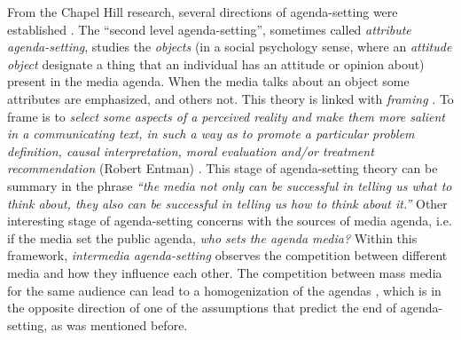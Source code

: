 \documentclass{bmcart}
\begin{document}
\par From the Chapel Hill research, several directions of agenda-setting were established \cite{mccombs2005look}.
The ``second level agenda-setting'', sometimes called \textit{attribute agenda-setting}, studies the \textit{objects} (in a social psychology sense, where an \textit{attitude object} designate a thing that an individual has an attitude or opinion about) present in the media agenda. When the media talks about an object some attributes are emphasized, and others not. 
This theory is linked with \textit{framing} \cite{guggenheim2015dynamics, tsur2015frame}. 
To frame is to \textit{select some aspects of a perceived reality and make them more salient in a communicating text, in such a way as to promote a particular problem definition, causal interpretation, moral evaluation and/or treatment recommendation} (Robert Entman) \cite{mccombs2005look}.
This stage of agenda-setting theory can be summary in the phrase \textit{``the media not only can be successful in telling us what to think about, they also can be successful in telling us how to think about it.''} 
Other interesting stage of agenda-setting concerns with the sources of media agenda, i.e. if the media set the public agenda, \textit{who sets the agenda media?} Within this framework, \textit{intermedia agenda-setting} observes the competition between different media and how they influence each other. The competition between mass media for the same audience can lead to a homogenization of the agendas \cite{vargo2017networks}, which is in the opposite direction of one of the assumptions that predict the end of agenda-setting, as was mentioned before.
\end{document}
